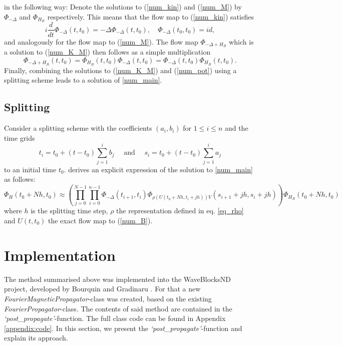 \documentclass{article}
\begin{document}
in the following way: Denote the solutions to (\ref{num_kin}) and (\ref{num_M}) by $\Phi_{-\Delta}$ and $\Phi_{H_B}$ respectively. This means that the flow map to (\ref{num_kin}) satisfies
\begin{equation}
  i \frac{d}{dt}\Phi_{-\Delta}(t, t_0) = -\Delta \Phi_{-\Delta}(t, t_0), \quad \Phi_{-\Delta}(t_0, t_0) = id,
\end{equation}
and analogously for the flow map to (\ref{num_M}). The flow map $\Phi_{-\Delta + H_B}$ which is a solution to (\ref{num_K_M}) then follows as a simple multiplication
\begin{equation}
  \Phi_{-\Delta + H_B}(t, t_0) = \Phi_{H_B}(t, t_0)\Phi_{-\Delta}(t, t_0) = \Phi_{-\Delta}(t, t_0)\Phi_{H_B}(t, t_0).
\end{equation}
Finally, combining the solutions to (\ref{num_K_M}) and (\ref{num_pot}) using a splitting scheme leads to a solution of \ref{num_main}.

\subsection{Splitting}
Consider a splitting scheme with the coefficients $(a_i, b_i)$ for $1 \leq i \leq n$ and the time grids
\begin{equation}
  t_{i}=t_{0}+\left(t-t_{0}\right) \sum_{j=1}^{i} b_{j} \quad \text { and } \quad s_{i}=t_{0}+\left(t-t_{0}\right) \sum_{j=1}^{i} a_{j}
\end{equation}
to an initial time $t_0$. \cite{paper_orvg} derives an explicit expression of the solution to \ref{num_main} as follows:
\begin{equation}
  \Phi_{H}\left(t_{0}+N h, t_{0}\right) \approx\left(\prod_{j=0}^{N-1} \prod_{i=0}^{n-1} \Phi_{-\Delta}\left(t_{i+1}, t_{i}\right) \Phi_{\rho\left(U\left(t_{0}+N h, t_{i}+j h\right)\right) V}\left(s_{i+1}+j h, s_{i}+j h\right)\right) \Phi_{H_{B}}\left(t_{0}+N h, t_{0}\right)
\end{equation}
where $h$ is the splitting time step, $\rho$ the representation defined in eq. \ref{eq_rho} and $U(t, t_0)$ the exact flow map to (\ref{num_B}).


\section{Implementation}
The method summarised above was implemented into the WaveBlocksND project, developed by Bourquin and Gradinaru \cite{waveblocksnd}. For that a new \textit{FourierMagneticPropagator}-class was created, based on the existing \textit{FourierPropagator}-class. The contents of said method are contained in the \textit{`post_propagate'}-function. The full class code can be found in Appendix \ref{appendix:code}. In this section, we present the \textit{`post_propagate'}-function and explain its approach.
\end{document}
